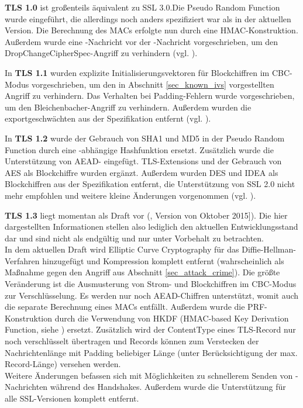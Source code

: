 \textbf{TLS 1.0} ist großenteils äquivalent zu SSL 3.0.Die Pseudo Random Function wurde eingeführt, die allerdings noch anders spezifiziert war als in der aktuellen Version. Die Berechnung des MACs erfolgte nun durch eine HMAC-Konstruktion. Außerdem wurde eine \changecipherspec{}-Nachricht vor der \finished{}-Nachricht vorgeschrieben, um den DropChangeCipherSpec-Angriff zu verhindern (vgl. \cite{tls10}).

In \textbf{TLS 1.1} wurden explizite Initialisierungsvektoren für Blockchiffren im CBC-Modus vorgeschrieben, um den in Abschnitt \ref{sec_known_ivs} vorgestellten Angriff zu verhindern. Das Verhalten bei Padding-Fehlern wurde vorgeschrieben, um den Bleichenbacher-Angriff zu verhindern. Außerdem wurden die exportgeschwächten \ciphersuites{} aus der Spezifikation entfernt (vgl. \cite{tls11}).

In \textbf{TLS 1.2} wurde der Gebrauch von SHA1 und MD5 in der Pseudo Random Function durch eine \ciphersuite{}-abhängige Hashfunktion ersetzt. Zusätzlich wurde die Unterstützung von AEAD-\ciphersuites{} eingefügt. TLS-Extensions und der Gebrauch von AES als Blockchiffre wurden ergänzt. Außerdem wurden DES und IDEA als Blockchiffren aus der Spezifikation entfernt, die Unterstützung von SSL 2.0 nicht mehr empfohlen und weitere kleine Änderungen vorgenommen (vgl. \cite{tls12}).

\textbf{TLS 1.3} liegt momentan als Draft vor (\cite{tls13}, Version von Oktober 2015]). Die hier dargestellten Informationen stellen also lediglich den aktuellen Entwicklungsstand dar und sind nicht als endgültig und nur unter Vorbehalt zu betrachten.\\
In dem aktuellen Draft wird Elliptic Curve Cryptography für das Diffie-Hellman-Verfahren hinzugefügt und  Kompression komplett entfernt (wahrscheinlich als Maßnahme gegen den Angriff aus Abschnitt \ref{sec_attack_crime}). Die größte Veränderung ist die Ausmusterung von Strom- und Blockchiffren im CBC-Modus zur Verschlüsselung. Es werden nur noch AEAD-Chiffren unterstützt, womit auch die separate Berechnung eines MACs entfällt. Außerdem wurde die PRF-Konstruktion durch die Verwendung von HKDF (HMAC-based Key Derivation Function, siehe \cite{krawczyk10}) ersetzt. Zusätzlich wird der ContentType eines TLS-Record nur noch verschlüsselt übertragen und Records können zum Verstecken der Nachrichtenlänge mit Padding beliebiger Länge (unter Berücksichtigung der max. Record-Länge) versehen werden. \\
Weitere Änderungen befassen sich mit Möglichkeiten zu schnellerem Senden von \applicationdata{}-Nachrichten während des Handshakes. Außerdem wurde die Unterstützung für alle SSL-Versionen komplett entfernt.

